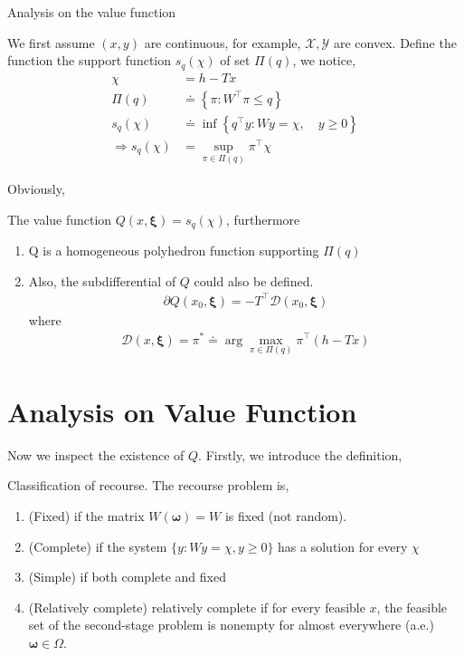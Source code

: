 \documentclass{beamerswitch}
\newcommand{\bxi}{\bm \xi}
\newcommand{\bo}{\bm \omega}
\theoremstyle{definition}
\begin{document}
\begin{frame}[allowframebreaks]{Analysis on the value function}


    We first assume \((x, y)\) are continuous, for example, \(\mathcal X, \mathcal Y\) are convex. Define the function the support function \(s_{q}(\chi)\) of set \(\Pi(q)\), we notice,
    \begin{align*}
        \chi                    & = h - Tx                                                        \\
        \Pi(q)                  & \doteq \left\{\pi: W^{\top} \pi \leq q\right\}                  \\
        s_{q}(\chi)             & \doteq \inf \left\{q^{\top} y: W y=\chi, \quad y \geq 0\right\} \\
        \Rightarrow s_{q}(\chi) & =\sup _{\pi \in \Pi(q)} \pi^{\top} \chi
    \end{align*}

    Obviously,
    \begin{theorem} The value function \(Q(x, \bxi) = s_q(\chi)\), furthermore
        \begin{enumerate}
            \item Q is a homogeneous polyhedron function supporting \(\Pi(q)\)
            \item Also, the subdifferential of \(Q\) could also be defined.
                  \begin{align*}
                      \partial Q\left(x_{0}, \bxi\right)=-T^{\top} \mathcal D \left(x_{0}, \bxi\right)
                  \end{align*}
                  where
                  \begin{align*}
                      \mathcal  D (x, \bxi) = \pi ^* \doteq \arg \max _{\pi \in \Pi(q)} \pi^{\top}(h-T x)
                  \end{align*}
        \end{enumerate}
    \end{theorem}
    \section{Analysis on Value Function}
    Now we inspect the existence of \(Q\). Firstly, we introduce the definition,
    \begin{definition}
        Classification of recourse.
        The recourse problem is,
        \begin{enumerate}[i]
            \item (Fixed) if the matrix \(W(\bo) = W\) is fixed (not random).
            \item (Complete) if the system \(\{y: Wy = \chi, y \ge 0\}\) has a solution for every \(\chi\)
            \item (Simple) if both complete and fixed
            \item (Relatively complete) relatively complete if for every feasible \(x\),
                  the feasible set of the second-stage problem is nonempty for almost everywhere (a.e.) \(\bm \omega \in \Omega\).
        \end{enumerate}
    \end{definition}


\end{frame}
\end{document}

